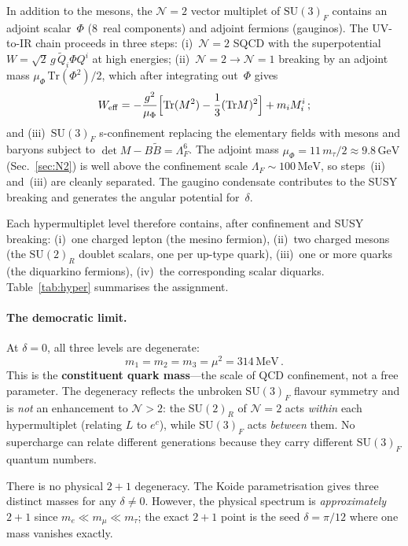 \documentclass[aps,prd,twocolumn,showpacs,preprintnumbers,superscriptaddress]{revtex4-2}
\newcommand{\SU}{\mathrm{SU}}
\newcommand{\Tr}{\mathrm{Tr}}
\newcommand{\MeV}{\,\mathrm{MeV}}
\newcommand{\GeV}{\,\mathrm{GeV}}
\begin{document}
In addition to the mesons, the $\mathcal{N}{=}2$ vector
multiplet of $\SU(3)_F$ contains an adjoint scalar~$\Phi$
(8~real components) and adjoint fermions (gauginos).
The UV-to-IR chain proceeds in three steps:
(i)~$\mathcal{N}{=}2$ SQCD with the superpotential
$W = \sqrt{2}\,g\,\tilde Q_i\Phi Q^i$ at high energies;
(ii)~$\mathcal{N}{=}2 \to \mathcal{N}{=}1$ breaking by an
adjoint mass $\mu_\Phi\,\Tr(\Phi^2)/2$, which after
integrating out~$\Phi$ gives
\begin{equation}
  W_{\mathrm{eff}} = -\frac{g^2}{\mu_\Phi}\Bigl[\Tr(M^2)
  - \frac{1}{3}(\Tr M)^2\Bigr] + m_i M^i_i\,;
  \label{eq:Weff}
\end{equation}
and (iii)~$\SU(3)_F$ s-confinement replacing the elementary
fields with mesons and baryons subject to
$\det M - B\tilde B = \Lambda_F^6$.
The adjoint mass
$\mu_\Phi = 11\,m_\tau/2 \approx 9.8\GeV$
(Sec.~\ref{sec:N2}) is well above the confinement scale
$\Lambda_F \sim 100\MeV$, so steps~(ii) and~(iii) are
cleanly separated.
The gaugino condensate contributes to the SUSY breaking
and generates the angular potential for~$\delta$.

Each hypermultiplet level therefore contains, after
confinement and SUSY breaking:
(i)~one charged lepton (the mesino fermion),
(ii)~two charged mesons (the $\SU(2)_R$ doublet scalars,
  one per up-type quark),
(iii)~one or more quarks (the diquarkino fermions),
(iv)~the corresponding scalar diquarks.
Table~\ref{tab:hyper} summarises the assignment.

\paragraph{The democratic limit.}

At $\delta = 0$, all three levels are degenerate:
\begin{equation}
  m_1 = m_2 = m_3 = \mu^2 = 314\MeV\,.
  \label{eq:democratic}
\end{equation}
This is the \textbf{constituent quark mass}---the scale of
QCD confinement, not a free parameter.
The degeneracy reflects the unbroken $\SU(3)_F$ flavour
symmetry and is \emph{not} an enhancement to
$\mathcal{N} > 2$: the $\SU(2)_R$ of $\mathcal{N}{=}2$
acts \emph{within} each hypermultiplet (relating $L$ to
$e^c$), while $\SU(3)_F$ acts \emph{between} them.
No supercharge can relate different generations because
they carry different $\SU(3)_F$ quantum numbers.

There is no physical $2+1$ degeneracy.  The Koide
parametrisation gives three distinct masses for any
$\delta \neq 0$.  However, the physical spectrum is
\emph{approximately} $2+1$ since $m_e \ll m_\mu \ll m_\tau$;
the exact $2+1$ point is the seed $\delta = \pi/12$ where
one mass vanishes exactly.
\end{document}

